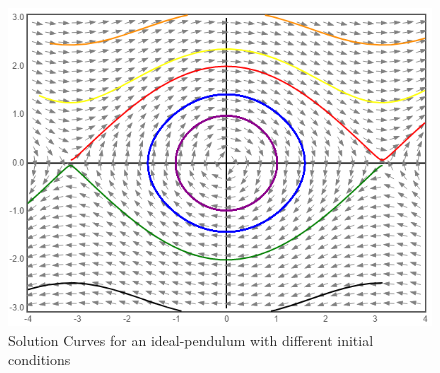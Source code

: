\documentclass[12pt,1in]{article}
\begin{document}
\begin{figure}[H]
	\centering
	\includegraphics[width=0.7\linewidth]{Figures/phase_online_pendulum}
	\caption{Solution Curves for an ideal-pendulum with different initial conditions}
	\label{fig:pendulum_solution_curves}
\end{figure}
\end{document}
